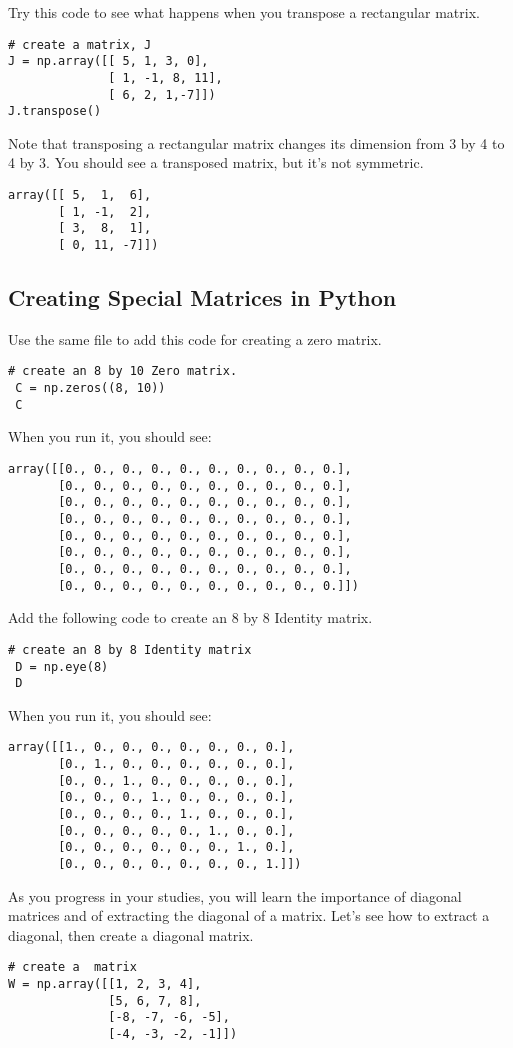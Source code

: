 Try this code to see what happens when you transpose a rectangular matrix. 
\begin{Verbatim}
# create a matrix, J
J = np.array([[ 5, 1, 3, 0], 
              [ 1, -1, 8, 11], 
              [ 6, 2, 1,-7]])
J.transpose()
\end{Verbatim}
Note that transposing a rectangular matrix changes its dimension from 3 by 4 to 4 by 3. You should see a transposed matrix, but it's not symmetric.
\begin{Verbatim}
array([[ 5,  1,  6],
       [ 1, -1,  2],
       [ 3,  8,  1],
       [ 0, 11, -7]])
\end{Verbatim}

\subsection{Creating Special Matrices in Python}
 Use the same file to add this code for creating a zero matrix.
\begin{Verbatim}
# create an 8 by 10 Zero matrix.
 C = np.zeros((8, 10))
 C
\end{Verbatim}
When you run it, you should see:
\begin{Verbatim}
array([[0., 0., 0., 0., 0., 0., 0., 0., 0., 0.],
       [0., 0., 0., 0., 0., 0., 0., 0., 0., 0.],
       [0., 0., 0., 0., 0., 0., 0., 0., 0., 0.],
       [0., 0., 0., 0., 0., 0., 0., 0., 0., 0.],
       [0., 0., 0., 0., 0., 0., 0., 0., 0., 0.],
       [0., 0., 0., 0., 0., 0., 0., 0., 0., 0.],
       [0., 0., 0., 0., 0., 0., 0., 0., 0., 0.],
       [0., 0., 0., 0., 0., 0., 0., 0., 0., 0.]])
\end{Verbatim}
Add the following code to create an 8 by 8 Identity matrix.
\begin{Verbatim}
# create an 8 by 8 Identity matrix 
 D = np.eye(8)
 D
\end{Verbatim}
When you run it, you should see:
\begin{Verbatim}
array([[1., 0., 0., 0., 0., 0., 0., 0.],
       [0., 1., 0., 0., 0., 0., 0., 0.],
       [0., 0., 1., 0., 0., 0., 0., 0.],
       [0., 0., 0., 1., 0., 0., 0., 0.],
       [0., 0., 0., 0., 1., 0., 0., 0.],
       [0., 0., 0., 0., 0., 1., 0., 0.],
       [0., 0., 0., 0., 0., 0., 1., 0.],
       [0., 0., 0., 0., 0., 0., 0., 1.]])
\end{Verbatim}
As you progress in your studies, you will learn the importance of diagonal matrices and of extracting the diagonal of a matrix. Let's see how to extract a diagonal, then create a diagonal matrix.
\begin{Verbatim}
# create a  matrix 
W = np.array([[1, 2, 3, 4], 
              [5, 6, 7, 8], 
              [-8, -7, -6, -5],
              [-4, -3, -2, -1]])
\end{Verbatim}
